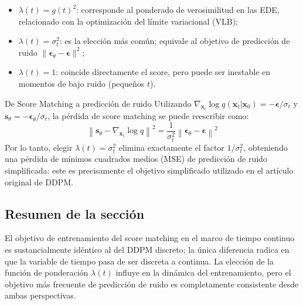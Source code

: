 \begin{itemize}
    \item $\lambda(t) = g(t)^2$: corresponde al ponderado de verosimilitud en las EDE, relacionado con la optimización del límite variacional (VLB);
    \item $\lambda(t) = \sigma_t^2$: es la elección más común; equivale al objetivo de predicción de ruido $\|\boldsymbol{\epsilon}_\theta - \boldsymbol{\epsilon}\|^2$;
    \item $\lambda(t) = 1$: coincide directamente el score, pero puede ser inestable en momentos de bajo ruido (pequeños $t$).
\end{itemize}

\begin{knowledgebox}{De Score Matching a predicción de ruido}
Utilizando $\nabla_{\mathbf{x}_t}\log q(\mathbf{x}_t|\mathbf{x}_0) = -\boldsymbol{\epsilon}/\sigma_t$ y $\mathbf{s}_\theta = -\boldsymbol{\epsilon}_\theta / \sigma_t$, la pérdida de score matching se puede reescribir como:
$$
\left\|\mathbf{s}_\theta - \nabla_{\mathbf{x}_t}\log q\right\|^2 = \frac{1}{\sigma_t^2}\left\|\boldsymbol{\epsilon}_\theta - \boldsymbol{\epsilon}\right\|^2
$$
Por lo tanto, elegir $\lambda(t) = \sigma_t^2$ elimina exactamente el factor $1/\sigma_t^2$, obteniendo una pérdida de mínimos cuadrados medios (MSE) de predicción de ruido simplificada: este es precisamente el objetivo simplificado utilizado en el artículo original de DDPM.
\end{knowledgebox}

\subsection{Resumen de la sección}

El objetivo de entrenamiento del score matching en el marco de tiempo continuo es sustancialmente idéntico al del DDPM discreto; la única diferencia radica en que la variable de tiempo pasa de ser discreta a continua. La elección de la función de ponderación $\lambda(t)$ influye en la dinámica del entrenamiento, pero el objetivo más frecuente de predicción de ruido es completamente consistente desde ambas perspectivas.
